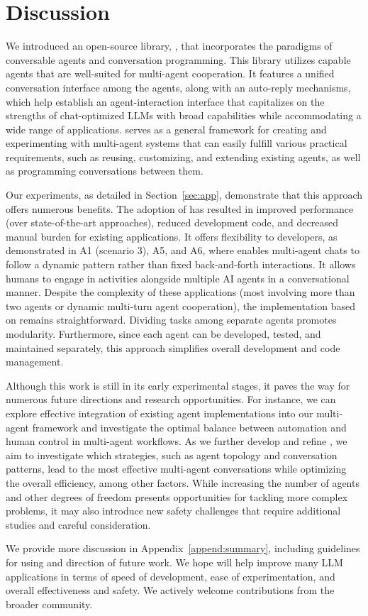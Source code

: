 \section{Discussion}
\label{sec:summary}

We introduced an open-source library, \libName, that incorporates the paradigms of conversable agents and conversation programming. This library utilizes capable agents that are well-suited for multi-agent cooperation. It features a unified conversation interface among the agents, along with an auto-reply mechanisms, which help establish an agent-interaction interface that capitalizes on the strengths of chat-optimized LLMs with broad capabilities while accommodating a wide range of applications. \libName serves as a general framework for creating and experimenting with multi-agent systems that can easily fulfill various practical requirements, such as reusing, customizing, and extending existing agents, as well as programming conversations between them.

Our experiments, as detailed in Section~\ref{sec:app}, demonstrate that this approach offers numerous benefits. 
The adoption of \libName has resulted in improved performance (over state-of-the-art approaches), reduced development code, and decreased manual burden for existing applications. It offers flexibility to developers, as demonstrated in A1 (scenario 3), A5, and A6, where \libName enables multi-agent chats to follow a dynamic pattern rather than fixed back-and-forth interactions. It allows humans to engage in activities alongside multiple AI agents in a conversational manner. Despite the complexity of these applications (most involving more than two agents or dynamic multi-turn agent cooperation), the implementation based on \libName remains straightforward. Dividing tasks among separate agents promotes modularity. 
Furthermore, since each agent can be developed, tested, and maintained separately, this approach simplifies overall development and code management.

Although this work is still in its early experimental stages, it paves the way for numerous future directions and research opportunities. For instance, we can explore effective integration of existing agent implementations into our multi-agent framework and investigate the optimal balance between automation and human control in multi-agent workflows. As we further develop and refine \libName, we aim to investigate which strategies, such as agent topology and conversation patterns, lead to the most effective multi-agent conversations while optimizing the overall efficiency, among other factors. While increasing the number of agents and other degrees of freedom presents opportunities for tackling more complex problems, it may also introduce new safety challenges that require additional studies and careful consideration.

We provide more discussion in Appendix~\ref{append:summary}, including guidelines for using \libName and direction of future work.
We hope \libName will help improve many LLM applications in terms of speed of development, ease of experimentation, and overall effectiveness and safety. We actively welcome contributions from the broader community. 

